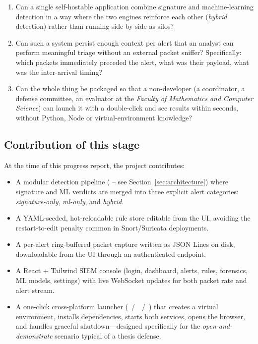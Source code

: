 \begin{enumerate}
    \item Can a single self-hostable application combine signature and
        machine-learning detection in a way where the two engines reinforce
        each other (\textit{hybrid} detection) rather than running
        side-by-side as silos?
    \item Can such a system persist enough context per alert that an
        analyst can perform meaningful triage without an external packet
        sniffer? Specifically: which packets immediately preceded the
        alert, what was their payload, what was the inter-arrival
        timing?
    \item Can the whole thing be packaged so that a non-developer (a
        coordinator, a defense committee, an evaluator at the
        \textit{Faculty of Mathematics and Computer Science}) can launch
        it with a double-click and see results within seconds, without
        Python, Node or virtual-environment knowledge?
\end{enumerate}

\subsection{Contribution of this stage}

At the time of this progress report, the project contributes:
\begin{itemize}
    \item A modular detection pipeline ( -- see
        Section~\ref{sec:architecture}) where signature and ML verdicts
        are merged into three explicit alert categories:
        \textit{signature-only}, \textit{ml-only}, and \textit{hybrid}.
    \item A YAML-seeded, hot-reloadable rule store editable from the UI,
        avoiding the restart-to-edit penalty common in Snort/Suricata
        deployments.
    \item A per-alert ring-buffered packet capture written as JSON Lines
        on disk, downloadable from the UI through an authenticated
        endpoint.
    \item A React + Tailwind SIEM console (login, dashboard, alerts,
        rules, forensics, ML models, settings) with live WebSocket
        updates for both packet rate and alert stream.
    \item A one-click cross-platform launcher
        (~/~~/~) that creates a
        virtual environment, installs dependencies, starts both
        services, opens the browser, and handles graceful
        shutdown---designed specifically for the
        \textit{open-and-demonstrate} scenario typical of a thesis
        defense.
\end{itemize}

